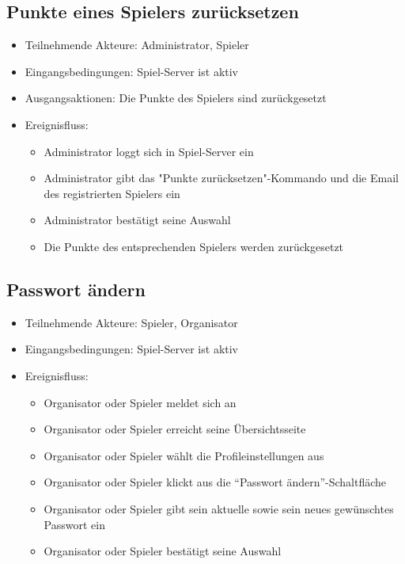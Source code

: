 \documentclass[a4paper]{scrreprt}
\begin{document}
    \subsection{Punkte eines Spielers zurücksetzen}
    \begin{itemize}
        \item Teilnehmende Akteure: \Gls{Administrator}, \Gls{Spieler}
        \item Eingangsbedingungen: Spiel-Server ist aktiv
        \item Ausgangsaktionen: Die Punkte des \Gls{Spieler}s sind zurückgesetzt
        \item Ereignisfluss:
        \begin{itemize}
            \item \Gls{Administrator} loggt sich in Spiel-Server ein
            \item \Gls{Administrator} gibt das "Punkte zurücksetzen"-Kommando und die Email des registrierten Spielers ein
            \item \Gls{Administrator} bestätigt seine Auswahl
            \item Die Punkte des entsprechenden \Gls{Spieler}s werden zurückgesetzt
        \end{itemize}
    \end{itemize}




    \subsection{Passwort ändern}
    \begin{itemize}
    \item Teilnehmende Akteure: \Gls{Spieler}, \Gls{Organisator}
    \item Eingangsbedingungen: Spiel-Server ist aktiv
    \item Ereignisfluss:
        \begin{itemize}
            \item \Gls{Organisator} oder \Gls{Spieler} meldet sich an
            \item \Gls{Organisator} oder \Gls{Spieler} erreicht seine Übersichtsseite
            \item \Gls{Organisator} oder \Gls{Spieler} wählt die Profileinstellungen aus
            \item \Gls{Organisator} oder \Gls{Spieler} klickt aus die \enquote{Passwort ändern}-Schaltfläche
            \item \Gls{Organisator} oder \Gls{Spieler} gibt sein aktuelle sowie sein neues gewünschtes Passwort ein
            \item \Gls{Organisator} oder \Gls{Spieler} bestätigt seine Auswahl
        \end{itemize}
    \end{itemize}
\end{document}
